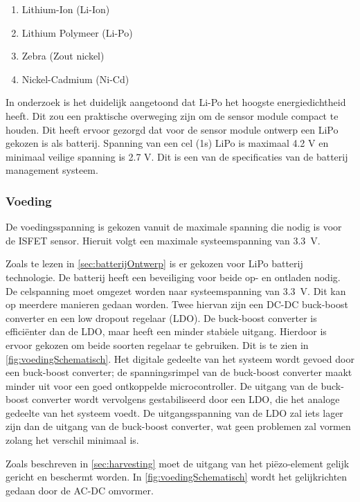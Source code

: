 \begin{enumerate}
    \item Lithium-Ion (Li-Ion)
    \item Lithium Polymeer (Li-Po)
    \item Zebra (Zout nickel) 
    \item Nickel-Cadmium (Ni-Cd)
\end{enumerate}

In onderzoek \cite{battery_comparison} is het duidelijk aangetoond dat Li-Po het hoogste energiedichtheid heeft. Dit zou een praktische overweging zijn om de sensor module compact te houden. Dit heeft ervoor gezorgd dat voor de sensor module ontwerp een LiPo gekozen is als batterij. Spanning van een cel (1s) LiPo is maximaal 4.2 V en minimaal veilige spanning is 2.7 V\cite{BatteryComparison}. Dit is een van de specificaties van de batterij management systeem. 


\subsubsection{Voeding} \label{sec:voeding}
De voedingsspanning is gekozen vanuit de maximale spanning die nodig is voor de ISFET sensor\cite{isfet}. Hieruit volgt een maximale systeemspanning van \qty{3.3}{\volt}.

Zoals te lezen in \cref{sec:batterijOntwerp} is er gekozen voor LiPo batterij technologie. De batterij heeft een beveiliging voor beide op- en ontladen nodig. De celspanning moet omgezet worden naar systeemspanning van \qty{3.3}{\volt}. Dit kan op meerdere manieren gedaan worden. Twee hiervan zijn een DC-DC buck-boost converter en een low dropout regelaar (LDO). De buck-boost converter is efficiënter dan de LDO, maar heeft een minder stabiele uitgang. Hierdoor is ervoor gekozen om beide soorten regelaar te gebruiken. Dit is te zien in \cref{fig:voedingSchematisch}. Het digitale gedeelte van het systeem wordt gevoed door een buck-boost converter; de spanningsrimpel van de buck-boost converter maakt minder uit voor een goed ontkoppelde microcontroller.
De uitgang van de buck-boost converter wordt vervolgens gestabiliseerd door een LDO, die het analoge gedeelte van het systeem voedt. De uitgangsspanning van de LDO zal iets lager zijn dan de uitgang van de buck-boost converter, wat geen problemen zal vormen zolang het verschil minimaal is.

Zoals beschreven in \cref{sec:harvesting} moet de uitgang van het piëzo-element gelijk gericht en beschermt worden. In \cref{fig:voedingSchematisch} wordt het gelijkrichten gedaan door de AC-DC omvormer.

